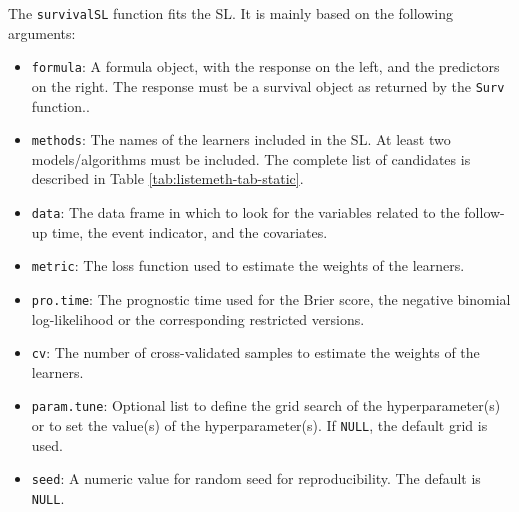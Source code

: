 The \texttt{survivalSL} function fits the SL. It is mainly based on the following arguments:

\begin{itemize}
\item
  \texttt{formula}: A formula object, with the response on the left, and the predictors on the right. The response must be a survival object as returned by the \texttt{Surv} function..
\item
  \texttt{methods}: The names of the learners included in the SL. At least two models/algorithms must be included. The complete list of candidates is described in Table \ref{tab:listemeth-tab-static}.
\item
  \texttt{data}: The data frame in which to look for the variables related to the follow-up time, the event indicator, and the covariates.
\item
  \texttt{metric}: The loss function used to estimate the weights of the learners.
\item
  \texttt{pro.time}: The prognostic time used for the Brier score, the negative binomial log-likelihood or the corresponding restricted versions.
\item
  \texttt{cv}: The number of cross-validated samples to estimate the weights of the learners.
\item
  \texttt{param.tune}: Optional list to define the grid search of the hyperparameter(s) or to set the value(s) of the hyperparameter(s). If \texttt{NULL}, the default grid is used.
\item
  \texttt{seed}: A numeric value for random seed for reproducibility. The default is \texttt{NULL}.
\end{itemize}

